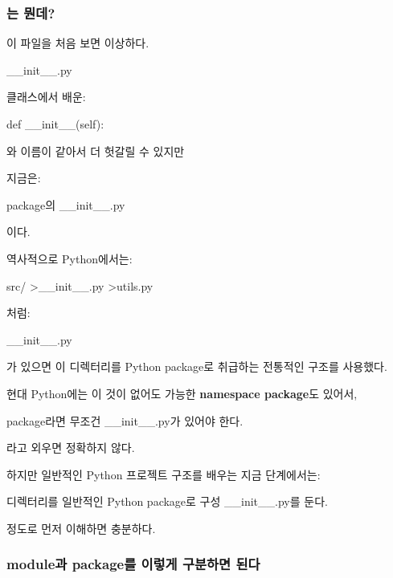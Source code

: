 \subsubsection{는 뭔데?}

이 파일을 처음 보면 이상하다.

\begin{dhksmry}[centered]
__init__.py
\end{dhksmry}

클래스에서 배운:

\begin{dhkcode}
def __init__(self):
\end{dhkcode}

와 이름이 같아서 더 헛갈릴 수 있지만

지금은:

\begin{dhksmry}[centered]
package의 __init__.py
\end{dhksmry}

이다.

역사적으로 Python에서는:

\begin{dhkdir}
src/
>__init__.py
>utils.py
\end{dhkdir}

처럼:

\begin{dhksmry}[centered]
__init__.py
\end{dhksmry}

가 있으면 이 디렉터리를 Python package로 취급하는 전통적인 구조를 사용했다.

현대 Python에는 이 것이 없어도 가능한 \textbf{namespace package}도 있어서,

\begin{dhksmry}[centered]
package라면 무조건 __init__.py가 있어야 한다.
\end{dhksmry}

라고 외우면 정확하지 않다.

하지만 일반적인 Python 프로젝트 구조를 배우는 지금 단계에서는:

\begin{dhksmry}[centered]
디렉터리를 일반적인 Python package로 구성
\da
__init__.py를 둔다.
\end{dhksmry}

정도로 먼저 이해하면 충분하다.

\subsubsection{module과 package를 이렇게 구분하면 된다}

